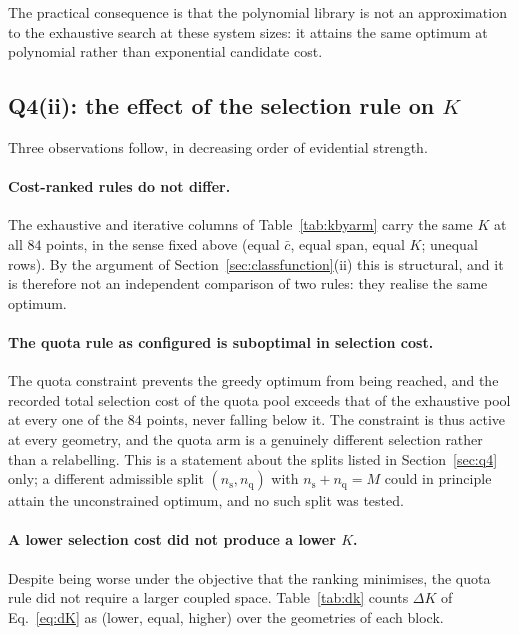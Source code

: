 The practical consequence is that the polynomial library is not an
approximation to the exhaustive search at these system sizes: it attains the
same optimum at polynomial rather than exponential candidate cost.

\subsection{Q4(ii): the effect of the selection rule on \texorpdfstring{$K$}{K}}



Three observations follow, in decreasing order of evidential strength.

\paragraph{Cost-ranked rules do not differ.}
The exhaustive and iterative columns of Table~\ref{tab:kbyarm} carry the same
$K$ at all $84$ points, in the sense fixed above (equal $\bar c$, equal span,
equal $K$; unequal rows). By the argument of
Section~\ref{sec:classfunction}(ii) this is structural, and it is therefore not
an independent comparison of two rules: they realise the same optimum.

\paragraph{The quota rule as configured is suboptimal in selection cost.}
The quota constraint prevents the greedy optimum from being reached, and the
recorded total selection cost of the quota pool exceeds that of the exhaustive
pool at every one of the $84$ points, never falling below it. The constraint is
thus active at every geometry, and the quota arm is a genuinely different
selection rather than a relabelling. This is a statement about the splits
listed in Section~\ref{sec:q4} only; a different admissible split
$(n_{\mathrm{s}},n_{\mathrm{q}})$ with $n_{\mathrm{s}}+n_{\mathrm{q}}=M$ could
in principle attain the unconstrained optimum, and no such split was tested.

\paragraph{A lower selection cost did not produce a lower $K$.}
Despite being worse under the objective that the ranking minimises, the quota
rule did not require a larger coupled space. Table~\ref{tab:dk} counts
$\Delta K$ of Eq.~\eqref{eq:dK} as (lower, equal, higher) over the geometries
of each block.

